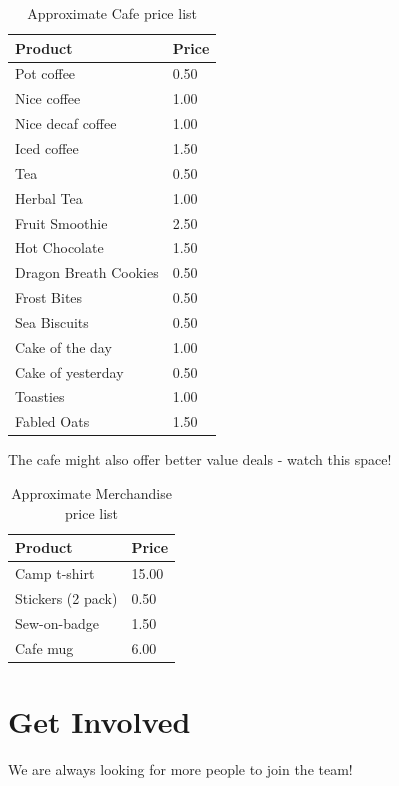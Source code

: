 \documentclass[a4paper, 11pt]{report}
\newcommand{\nl}{\newline}
\begin{document}
\begin{table}[H]
    \centering
    {\RaggedRight
    \begin{tabular}{p{}p{}}
        \textbf{Product} & \textbf{Price}\\
        \hline
        Pot coffee & 0.50\\
        Nice coffee & 1.00\\
        Nice decaf coffee & 1.00\\
        Iced coffee & 1.50\\
        \hline
        Tea & 0.50\\
        Herbal Tea & 1.00\\
        \hline
        Fruit Smoothie & 2.50\\
        Hot Chocolate & 1.50\\
        \hline
        Dragon Breath Cookies & 0.50\\
        Frost Bites & 0.50\\
        Sea Biscuits & 0.50\\
        \hline
        Cake of the day & 1.00\\
        Cake of yesterday & 0.50\\
        \hline
        Toasties & 1.00\\
        Fabled Oats & 1.50\\
        \hline
    \end{tabular}
    }%
    \caption{Approximate Cafe price list}
\end{table}
The cafe might also offer better value deals - watch this space!
\begin{table}[H]
    \centering
    {\RaggedRight
    \begin{tabular}{p{}p{}}
        \textbf{Product} & \textbf{Price}\\
        \hline
        Camp t-shirt & 15.00\\
        \hline
        Stickers (2 pack) & 0.50\\
        Sew-on-badge & 1.50\\
        \hline
        Cafe mug & 6.00\\
        \hline
    \end{tabular}
    }%
    \caption{Approximate Merchandise price list}
\end{table}

\chapter{Get Involved}
We are always looking for more people to join the team!\nl
\end{document}
